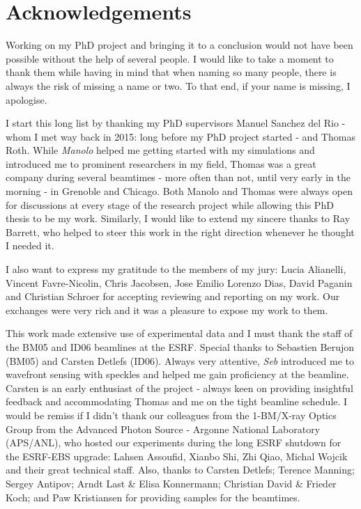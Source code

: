 
\chapter*{Acknowledgements}
\label{sec:acknowledgement}
\vspace*{-10mm}

Working on my PhD project and bringing it to a conclusion would not have been possible without the help of several people. I would like to take a moment to thank them while having in mind that when naming so many people, there is always the risk of missing a name or two. To that end, if your name is missing, I apologise.

I start this long list by thanking my PhD supervisors Manuel Sanchez del Rio - whom I met way back in 2015: long before my PhD project started - and Thomas Roth. While \textit{Manolo} helped me getting started with my simulations and introduced me to prominent researchers in my field, Thomas was a great company during several beamtimes - more often than not, until very early in the morning - in Grenoble and Chicago. Both Manolo and Thomas were always open for discussions at every stage of the research project while allowing this PhD thesis to be my work. Similarly, I would like to extend my sincere thanks to Ray Barrett, who helped to steer this work in the right direction whenever he thought I needed it.

I also want to express my gratitude to the members of my jury: Lucia Alianelli, Vincent Favre-Nicolin, Chris Jacobsen, Jose Emilio Lorenzo Dias, David Paganin and Christian Schroer for accepting reviewing and reporting on my work. Our exchanges were very rich and it was a pleasure to expose my work to them.

This work made extensive use of experimental data and I must thank the staff of the BM05 and ID06 beamlines at the ESRF. Special thanks to Sebastien Berujon (BM05) and Carsten Detlefs (ID06). Always very attentive, \textit{Seb} introduced me to wavefront sensing with speckles and helped me gain proficiency at the beamline. Carsten is an early enthusiast of the project - always keen on providing insightful feedback and accommodating Thomas and me on the tight beamline schedule. I would be remiss if I didn’t thank our colleagues from the 1-BM/X-ray Optics Group from the Advanced Photon Source - Argonne National Laboratory (APS/ANL), who hosted our experiments during the long ESRF shutdown for the ESRF-EBS upgrade: Lahsen Assoufid, Xianbo Shi, Zhi Qiao, Michal Wojcik and their great technical staff. Also, thanks to Carsten Detlefs; Terence Manning; Sergey Antipov; Arndt Last \& Elisa Konnermann; Christian David \& Frieder Koch;  and Paw Kristiansen for providing samples for the beamtimes.


